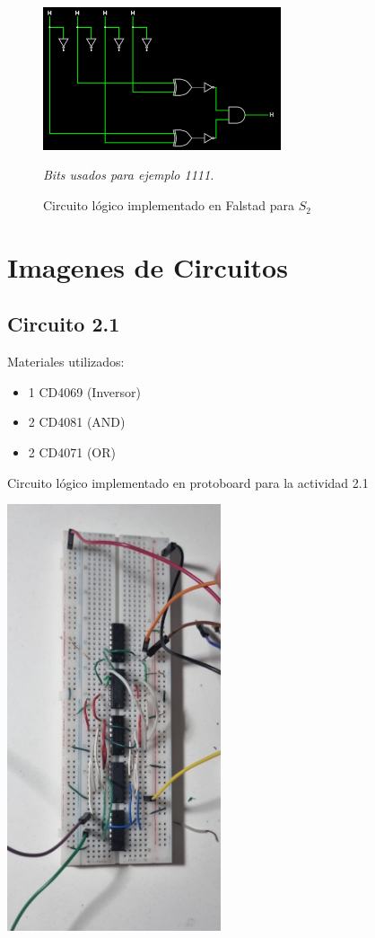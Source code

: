 \begin{figure}[h!]
    \centering
    \includegraphics[width=7cm]{imagenes/2.2_S2.png}
    \caption{Circuito lógico implementado en Falstad para $S_2$}
    \footnotesize\textit{Bits usados para ejemplo 1111.}
\end{figure}


\section{Imagenes de Circuitos}


\subsection{Circuito 2.1}

    Materiales utilizados:
    \begin{itemize}
        \item 1 CD4069 (Inversor)
        \item 2 CD4081 (AND)
        \item 2 CD4071 (OR)
        
    \end{itemize}

    Circuito lógico implementado en protoboard para la actividad 2.1
    \begin{center}
    \includegraphics[width=6.3cm]{imagenes/Circuito1.jpg}
    \end{center}

